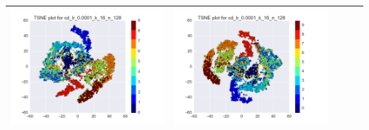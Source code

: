 \documentclass[12pt]{report}
\begin{document}
\begin{table}[H]
\begin{tabular}{ | c | c | c | c || c |}
\begin{minipage}{.3\textwidth}
      \includegraphics[scale=0.25]{cd_lr_0_0001_k_16_n_128.png}
    \end{minipage} &
    \begin{minipage}{.3\textwidth}
      \includegraphics[scale=0.25]{test_cd_lr_0_0001_k_16_n_128.png}
    \end{minipage}
        \\ \hline
  \end{tabular}
\end{table}
\end{document}
